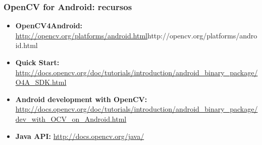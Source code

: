 \frame
{
\frametitle{OpenCV for Android: recursos}
\begin{itemize}
\item \textbf{OpenCV4Android:} \url{http://opencv.org/platforms/android.html}{http://opencv.org/platforms/android.html}
\item \textbf{Quick Start:} \url{http://docs.opencv.org/doc/tutorials/introduction/android_binary_package/O4A_SDK.html}
\item \textbf{Android development with OpenCV:} \url{http://docs.opencv.org/doc/tutorials/introduction/android_binary_package/dev_with_OCV_on_Android.html}
\item \textbf{Java API:} \url{http://docs.opencv.org/java/}
\end{itemize}
}
